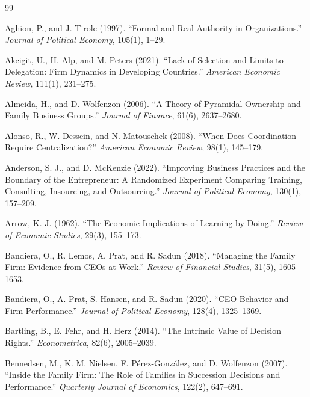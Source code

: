 \documentclass[11pt,a4paper]{article}
\theoremstyle{plain}
\begin{document}
\begin{thebibliography}{99}
\small

Aghion, P., and J. Tirole (1997). ``Formal and Real Authority in Organizations.'' \emph{Journal of Political Economy}, 105(1), 1--29.

Akcigit, U., H. Alp, and M. Peters (2021). ``Lack of Selection and Limits to Delegation: Firm Dynamics in Developing Countries.'' \emph{American Economic Review}, 111(1), 231--275.

Almeida, H., and D. Wolfenzon (2006). ``A Theory of Pyramidal Ownership and Family Business Groups.'' \emph{Journal of Finance}, 61(6), 2637--2680.

Alonso, R., W. Dessein, and N. Matouschek (2008). ``When Does Coordination Require Centralization?'' \emph{American Economic Review}, 98(1), 145--179.

Anderson, S. J., and D. McKenzie (2022). ``Improving Business Practices and the Boundary of the Entrepreneur: A Randomized Experiment Comparing Training, Consulting, Insourcing, and Outsourcing.'' \emph{Journal of Political Economy}, 130(1), 157--209.

Arrow, K. J. (1962). ``The Economic Implications of Learning by Doing.'' \emph{Review of Economic Studies}, 29(3), 155--173.

Bandiera, O., R. Lemos, A. Prat, and R. Sadun (2018). ``Managing the Family Firm: Evidence from CEOs at Work.'' \emph{Review of Financial Studies}, 31(5), 1605--1653.

Bandiera, O., A. Prat, S. Hansen, and R. Sadun (2020). ``CEO Behavior and Firm Performance.'' \emph{Journal of Political Economy}, 128(4), 1325--1369.

Bartling, B., E. Fehr, and H. Herz (2014). ``The Intrinsic Value of Decision Rights.'' \emph{Econometrica}, 82(6), 2005--2039.

Bennedsen, M., K. M. Nielsen, F. P\'erez-Gonz\'alez, and D. Wolfenzon (2007). ``Inside the Family Firm: The Role of Families in Succession Decisions and Performance.'' \emph{Quarterly Journal of Economics}, 122(2), 647--691.


\end{thebibliography}
\end{document}
